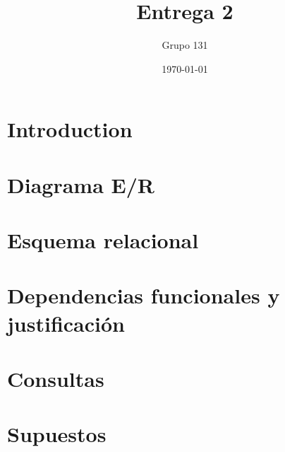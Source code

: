 \documentclass{article}
\title{Entrega 2}
\author{Grupo 131}
\date{\today}
\begin{document}
\maketitle

\section{Introduction}

\section{Diagrama E/R}

\section{Esquema relacional}

\section{Dependencias funcionales y justificación}

\section{Consultas}

\section{Supuestos}
\end{document}
